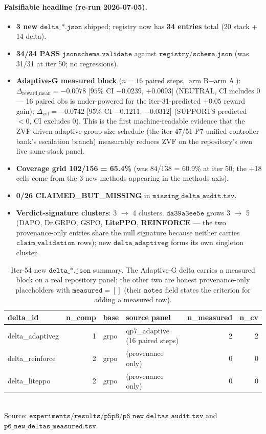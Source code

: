 \documentclass{article}
\begin{document}
\paragraph{Falsifiable headline (re-run 2026-07-05).}
\begin{itemize}
\item \textbf{3 new $\texttt{delta\_*.json}$} shipped; registry
now has \textbf{34 entries} total (20 stack + 14 delta).
\item \textbf{34/34 PASS} $\texttt{jsonschema.validate}$ against
$\texttt{registry/schema.json}$ (was 31/31 at iter 50; no
regressions).
\item \textbf{Adaptive-G measured block} ($n=16$ paired steps,
$\text{arm B} - \text{arm A}$):
$\Delta_{\text{reward\_mean}} = -0.0078$ [$95\%$ CI $-0.0239$,
$+0.0093$] (NEUTRAL, CI includes 0 --- 16 paired obs is
under-powered for the iter-31-predicted $+0.05$ reward gain);
$\Delta_{\text{zvf}} = \mathbf{-0.0742}$ [$95\%$ CI $-0.1211$,
$-0.0312$] (SUPPORTS predicted $<0$, CI excludes 0). This is the
first machine-readable evidence that the ZVF-driven adaptive
group-size schedule (the iter-47/51 P7 unified controller bank's
escalation branch) measurably reduces ZVF on the repository's own
live same-stack panel.
\item \textbf{Coverage grid 102/156 = 65.4\%} (was 84/138 = 60.9\%
at iter 50; the +18 cells come from the 3 new methods appearing in
the methods axis).
\item \textbf{0/26 CLAIMED\_BUT\_MISSING} in
$\texttt{missing\_delta\_audit.tsv}$.
\item \textbf{Verdict-signature clusters}: 3 $\to$ 4 clusters.
$\texttt{da39a3ee5e}$ grows 3 $\to$ 5 (DAPO, Dr.GRPO, GSPO,
\textbf{LitePPO}, \textbf{REINFORCE} --- the two provenance-only
entries share the null signature because neither carries
$\texttt{claim\_validation}$ rows); new
$\texttt{delta\_adaptiveg}$ forms its own singleton cluster.
\end{itemize}

\begin{table}[t]
\centering\small
\caption{Iter-54 new $\texttt{delta\_*.json}$ summary. The Adaptive-G
delta carries a measured block on a real repository panel; the other two
are honest provenance-only placeholders with $\texttt{measured}=[]$
(their $\texttt{notes}$ field states the criterion for adding a
measured row).}
\label{tab:p6-new-deltas}
\begin{tabular}{l r l l r r}
\toprule
delta\_id & n\_comp & base & source panel & n\_measured & n\_cv \\
\midrule
delta\_adaptiveg & 1 & grpo & qp7\_adaptive (16 paired steps) & 2 & 2 \\
delta\_reinforce  & 2 & grpo & (provenance only)         & 0 & 0 \\
delta\_liteppo    & 2 & grpo & (provenance only)         & 0 & 0 \\
\bottomrule
\end{tabular}\\
\footnotesize{Source: $\texttt{experiments/results/p5p8/p6\_new\_deltas\_audit.tsv}$
and $\texttt{p6\_new\_deltas\_measured.tsv}$.}
\end{table}
\end{document}

